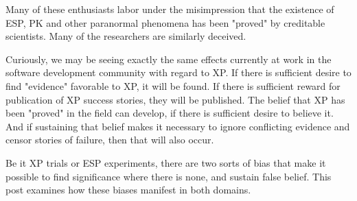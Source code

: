 \documentclass{article}
\begin{document}
Many of these enthusiasts labor under the misimpression that the
existence of ESP, PK and other paranormal phenomena has been "proved" by
creditable scientists. Many of the researchers are similarly deceived.

Curiously, we may be seeing exactly the same effects currently at work
in the software development community with regard to XP. If there is
sufficient desire to find "evidence" favorable to XP, it will be found.
If there is sufficient reward for publication of XP success stories,
they will be published. The belief that XP has been "proved" in the
field can develop, if there is sufficient desire to believe it. And if
sustaining that belief makes it necessary to ignore conflicting evidence
and censor stories of failure, then that will also occur.

Be it XP trials or ESP experiments, there are two sorts of bias that
make it possible to find significance where there is none, and sustain
false belief. This post examines how these biases manifest in both
domains.
\end{document}
